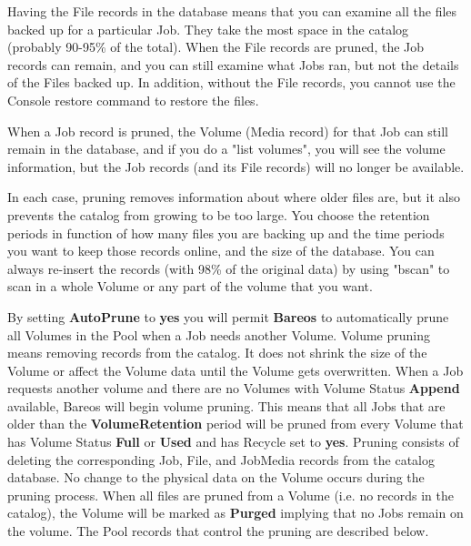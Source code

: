 Having the File records in the database means that you can examine all the
files backed up for a particular Job. They take the most space in the catalog
(probably 90-95\% of the total). When the File records are pruned, the Job
records can remain, and you can still examine what Jobs ran, but not the
details of the Files backed up. In addition, without the File records, you
cannot use the Console restore command to restore the files.

When a Job record is pruned, the Volume (Media record) for that Job can still
remain in the database, and if you do a "list volumes", you will see the
volume information, but the Job records (and its File records) will no longer
be available.

In each case, pruning removes information about where older files are, but it
also prevents the catalog from growing to be too large. You choose the
retention periods in function of how many files you are backing up and the
time periods you want to keep those records online, and the size of the
database. You can always re-insert the records (with 98\% of the original data)
by using "bscan" to scan in a whole Volume or any part of the volume that
you want.

By setting {\bf AutoPrune} to {\bf yes} you will permit {\bf Bareos} to
automatically prune all Volumes in the Pool when a Job needs another Volume.
Volume pruning means removing records from the catalog. It does not shrink the
size of the Volume or affect the Volume data until the Volume gets
overwritten. When a Job requests another volume and there are no Volumes with
Volume Status {\bf Append} available, Bareos will begin volume pruning. This
means that all Jobs that are older than the {\bf VolumeRetention} period will
be pruned from every Volume that has Volume Status {\bf Full} or {\bf Used}
and has Recycle set to {\bf yes}. Pruning consists of deleting the
corresponding Job, File, and JobMedia records from the catalog database. No
change to the physical data on the Volume occurs during the pruning process.
When all files are pruned from a Volume (i.e. no records in the catalog), the
Volume will be marked as {\bf Purged} implying that no Jobs remain on the
volume. The Pool records that control the pruning are described below.

